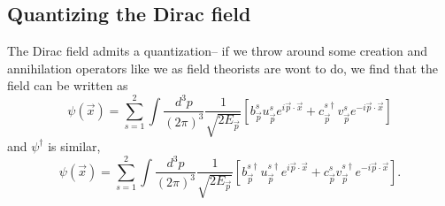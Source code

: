 \subsection*{Quantizing the Dirac field} The Dirac field admits a quantization-- if we throw around some creation and annihilation operators like we as field theorists are wont to do, we find that the field can be written as
$$\psi(\vec x)=\sum_{s=1}^2 \int \frac{d^3p}{(2\pi)^3}\frac{1}{\sqrt{2E_{\vec p}}} \left[ b_{\vec p}^s u_{\vec p}^s e^{i\vec p \cdot \vec x} +c_{\vec p}^{s\dagger} v_{\vec p}^s e^{-i \vec p \cdot \vec x}\right]$$
and $\psi^\dagger$ is similar,
$$\psi(\vec x)=\sum_{s=1}^2 \int \frac{d^3p}{(2\pi)^3}\frac{1}{\sqrt{2E_{\vec p}}} \left[ b_{\vec p}^{s\dagger} u_{\vec p}^{s\dagger} e^{i\vec p \cdot \vec x} +c_{\vec p}^{s} v_{\vec p}^{s\dagger} e^{-i \vec p \cdot \vec x}\right].$$